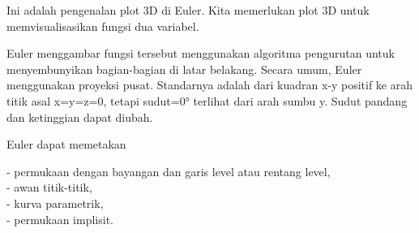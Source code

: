 \documentclass[a4paper,10pt]{article}
\begin{document}
\begin{eulernotebook}
\begin{eulercomment}
Ini adalah pengenalan plot 3D di Euler. Kita memerlukan plot 3D untuk
memvisualisasikan fungsi dua variabel.

Euler menggambar fungsi tersebut menggunakan algoritma pengurutan
untuk menyembunyikan bagian-bagian di latar belakang. Secara umum,
Euler menggunakan proyeksi pusat. Standarnya adalah dari kuadran x-y
positif ke arah titik asal x=y=z=0, tetapi sudut=0° terlihat dari arah
sumbu y. Sudut pandang dan ketinggian dapat diubah.

Euler dapat memetakan

- permukaan dengan bayangan dan garis level atau rentang level,\\
- awan titik-titik,\\
- kurva parametrik,\\
- permukaan implisit.


\end{eulercomment}
\end{eulernotebook}
\end{document}
